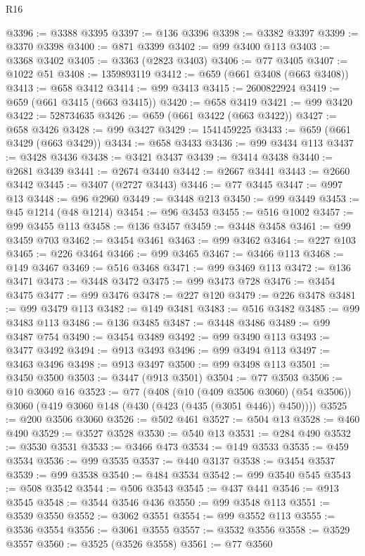 \begin{lexlean}{R16}
\begin{coremodule}
@3396 := @3388 @3395
@3397 := @136 @3396
@3398 := @3382 @3397
@3399 := @3370 @3398
@3400 := @871 @3399
@3402 := @99 @3400 @113
@3403 := @3368 @3402
@3405 := @3363 (@2823 @3403)
@3406 := @77 @3405
@3407 := @1022 @51
@3408 := 1359893119
@3412 := @659 (@661 @3408 (@663 @3408))
@3413 := @658 @3412
@3414 := @99 @3413
@3415 := 2600822924
@3419 := @659 (@661 @3415 (@663 @3415))
@3420 := @658 @3419
@3421 := @99 @3420
@3422 := 528734635
@3426 := @659 (@661 @3422 (@663 @3422))
@3427 := @658 @3426
@3428 := @99 @3427
@3429 := 1541459225
@3433 := @659 (@661 @3429 (@663 @3429))
@3434 := @658 @3433
@3436 := @99 @3434 @113
@3437 := @3428 @3436
@3438 := @3421 @3437
@3439 := @3414 @3438
@3440 := @2681 @3439
@3441 := @2674 @3440
@3442 := @2667 @3441
@3443 := @2660 @3442
@3445 := @3407 (@2727 @3443)
@3446 := @77 @3445
@3447 := @997 @13
@3448 := @96 @2960
@3449 := @3448 @213
@3450 := @99 @3449
@3453 := @45 @1214 (@48 @1214)
@3454 := @96 @3453
@3455 := @516 @1002
@3457 := @99 @3455 @113
@3458 := @136 @3457
@3459 := @3448 @3458
@3461 := @99 @3459 @703
@3462 := @3454 @3461
@3463 := @99 @3462
@3464 := @227 @103
@3465 := @226 @3464
@3466 := @99 @3465
@3467 := @3466 @113
@3468 := @149 @3467
@3469 := @516 @3468
@3471 := @99 @3469 @113
@3472 := @136 @3471
@3473 := @3448 @3472
@3475 := @99 @3473 @728
@3476 := @3454 @3475
@3477 := @99 @3476
@3478 := @227 @120
@3479 := @226 @3478
@3481 := @99 @3479 @113
@3482 := @149 @3481
@3483 := @516 @3482
@3485 := @99 @3483 @113
@3486 := @136 @3485
@3487 := @3448 @3486
@3489 := @99 @3487 @754
@3490 := @3454 @3489
@3492 := @99 @3490 @113
@3493 := @3477 @3492
@3494 := @913 @3493
@3496 := @99 @3494 @113
@3497 := @3463 @3496
@3498 := @913 @3497
@3500 := @99 @3498 @113
@3501 := @3450 @3500
@3503 := @3447 (@913 @3501)
@3504 := @77 @3503
@3506 := @10 @3060 @16
@3523 := @77
    (@408
      (@10 (@409 @3506 @3060) (@54 @3506))
      @3060
      (@419 @3060 @148 (@430 (@423 (@435 (@3051 @446)) @450))))
@3525 := @200 @3506 @3060
@3526 := @502 @461
@3527 := @504 @13
@3528 := @460 @490
@3529 := @3527 @3528
@3530 := @540 @13
@3531 := @284 @490
@3532 := @3530 @3531
@3533 := @3466 @473
@3534 := @149 @3533
@3535 := @459 @3534
@3536 := @99 @3535
@3537 := @440 @3137
@3538 := @3454 @3537
@3539 := @99 @3538
@3540 := @484 @3534
@3542 := @99 @3540 @545
@3543 := @508 @3542
@3544 := @506 @3543
@3545 := @437 @441
@3546 := @913 @3545
@3548 := @3544 @3546 @436
@3550 := @99 @3548 @113
@3551 := @3539 @3550
@3552 := @3062 @3551
@3554 := @99 @3552 @113
@3555 := @3536 @3554
@3556 := @3061 @3555
@3557 := @3532 @3556
@3558 := @3529 @3557
@3560 := @3525 (@3526 @3558)
@3561 := @77 @3560

\end{coremodule}
\end{lexlean}
